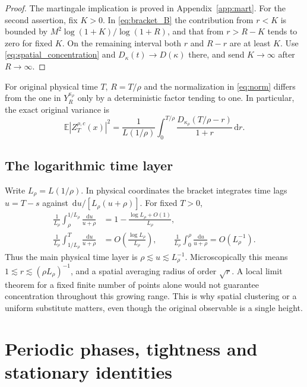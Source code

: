 \documentclass[11pt]{article}
\numberwithin{equation}{section}
\theoremstyle{definition}
\theoremstyle{remark}
\newcommand{\E}{\mathbb E}
\newcommand{\dd}{\,\mathrm d}
\begin{document}
\begin{proof}
The martingale implication is proved in Appendix~\ref{app:mart}. For the second assertion, fix $K>0$. In \eqref{eq:bracket_B} the contribution from $r<K$ is bounded by $M^2\log(1+K)/\log(1+R)$, and that from $r>R-K$ tends to zero for fixed $K$. On the remaining interval both $r$ and $R-r$ are at least $K$. Use \eqref{eq:spatial_concentration} and $D_\kappa(t)\to D(\kappa)$ there, and send $K\to\infty$ after $R\to\infty$.
\end{proof}
For original physical time $T$, $R=T/\rho$ and the normalization in \eqref{eq:norm} differs from the one in $Y_R^{\kappa_\rho}$ only by a deterministic factor tending to one. In particular, the exact original variance is
\begin{equation}\label{eq:diagonalvar}
 \E|Z_T^{\rho,c}(x)|^2=\frac{1}{L(1/\rho)}\int_0^{T/\rho}
 \frac{D_{\kappa_\rho}(T/\rho-r)}{1+r}\dd r.
\end{equation}
\subsection{The logarithmic time layer}
Write $L_\rho=L(1/\rho)$. In physical coordinates the bracket integrates time lags $u=T-s$ against $\dd u/[L_\rho(u+\rho)]$. For fixed $T>0$,
\begin{align*}
 \frac1{L_\rho}\int_\rho^{1/L_\rho}\frac{\dd u}{u+\rho}
 &=1-\frac{\log L_\rho+O(1)}{L_\rho},\\
 \frac1{L_\rho}\int_{1/L_\rho}^T\frac{\dd u}{u+\rho}
 &=O\left(\frac{\log L_\rho}{L_\rho}\right),\qquad
 \frac1{L_\rho}\int_0^\rho\frac{\dd u}{u+\rho}=O(L_\rho^{-1}).
\end{align*}
Thus the main physical time layer is $\rho\lesssim u\lesssim L_\rho^{-1}$. Microscopically this means $1\lesssim r\lesssim (\rho L_\rho)^{-1}$, and a spatial averaging radius of order $\sqrt r$. A local limit theorem for a fixed finite number of points alone would not guarantee concentration throughout this growing range. This is why spatial clustering or a uniform substitute matters, even though the original observable is a single height.

\section{Periodic phases, tightness and stationary identities}
\end{document}
